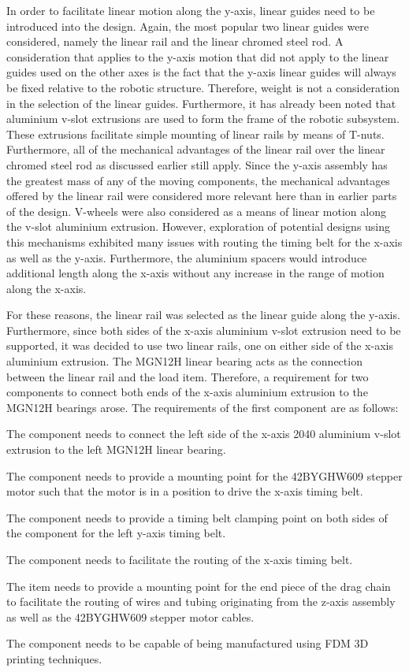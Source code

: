 In order to facilitate linear motion along the y-axis, linear guides need to be introduced into the design. Again, the most popular two linear guides were considered, namely the linear rail and the linear chromed steel rod. A consideration that applies to the y-axis motion that did not apply to the linear guides used on the other axes is the fact that the y-axis linear guides will always be fixed relative to the robotic structure. Therefore, weight is not a consideration in the selection of the linear guides. Furthermore, it has already been noted that aluminium v-slot extrusions are used to form the frame of the robotic subsystem. These extrusions facilitate simple mounting of linear rails by means of T-nuts. Furthermore, all of the mechanical advantages of the linear rail over the linear chromed steel rod as discussed earlier still apply. Since the y-axis assembly has the greatest mass of any of the moving components, the mechanical advantages offered by the linear rail were considered more relevant here than in earlier parts of the design. V-wheels were also considered as a means of linear motion along the v-slot aluminium extrusion. However, exploration of potential designs using this mechanisms exhibited many issues with routing the timing belt for the x-axis as well as the y-axis. Furthermore, the aluminium spacers would introduce additional length along the x-axis without any increase in the range of motion along the x-axis. 

For these reasons, the linear rail was selected as the linear guide along the y-axis. Furthermore, since both sides of the x-axis aluminium v-slot extrusion need to be supported, it was decided to use two linear rails, one on either side of the x-axis aluminium extrusion. The MGN12H linear bearing acts as the connection between the linear rail and the load item. Therefore, a requirement for two components to connect both ends of the x-axis aluminium extrusion to the MGN12H bearings arose. The requirements of the first component are as follows:

\begin{compactitem}
	\item The component needs to connect the left side of the x-axis 2040 aluminium v-slot extrusion to the left MGN12H linear bearing.
	\item The component needs to provide a mounting point for the 42BYGHW609 stepper motor such that the motor is in a position to drive the x-axis timing belt.
	\item The component needs to provide a timing belt clamping point on both sides of the component for the left y-axis timing belt.
	\item The component needs to facilitate the routing of the x-axis timing belt.
	\item The item needs to provide a mounting point for the end piece of the drag chain to facilitate the routing of wires and tubing originating from the z-axis assembly as well as the 42BYGHW609 stepper motor cables.
	\item The component needs to be capable of being manufactured using FDM 3D printing techniques.
\end{compactitem}

